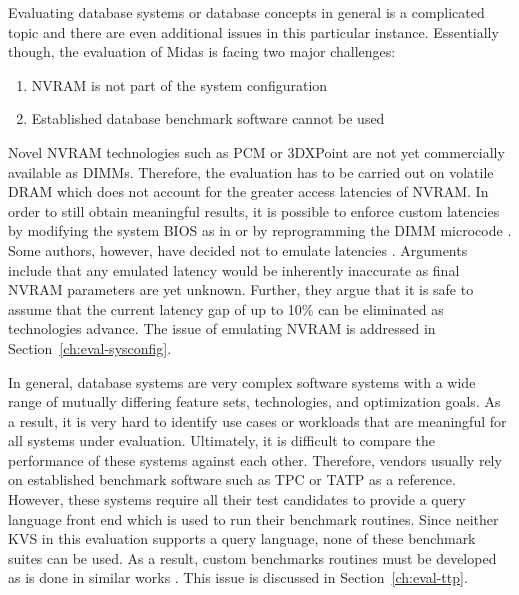 Evaluating database systems or database concepts in general is a complicated
topic and there are even additional issues in this particular instance.
Essentially though, the evaluation of Midas is facing two major challenges:

\begin{enumerate}
    \item NVRAM is not part of the system configuration
    \item Established database benchmark software cannot be used
\end{enumerate}

Novel NVRAM technologies such as PCM or 3DXPoint are not yet commercially
available as DIMMs. Therefore, the evaluation has to be carried out on volatile
DRAM which does not account for the greater access latencies of NVRAM. In order
to still obtain meaningful results, it is possible to enforce custom latencies
by modifying the system BIOS as in \cite{dulloor2014system, oukid2015instant} or
by reprogramming the DIMM microcode \cite{schwalb2016hyrise}. Some authors,
however, have decided not to emulate latencies \cite{bailey2013exploring,
zhou2016nvht}. Arguments include that any emulated latency would be inherently
inaccurate as final NVRAM parameters are yet unknown. Further, they argue that
it is safe to assume that the current latency gap of up to 10\% can be
eliminated as technologies advance. The issue of emulating NVRAM is addressed in
Section~\ref{ch:eval-sysconfig}.

In general, database systems are very complex software systems with a wide range
of mutually differing feature sets, technologies, and optimization goals. As a
result, it is very hard to identify use cases or workloads that are meaningful
for all systems under evaluation. Ultimately, it is difficult to compare the
performance of these systems against each other. Therefore, vendors usually rely
on established benchmark software such as TPC \cite{schwalb2016hyrise} or TATP
\cite{oukid2015instant} as a reference. However, these systems require all their
test candidates to provide a query language front end which is used to run their
benchmark routines. Since neither KVS in this evaluation supports a query
language, none of these benchmark suites can be used. As a result, custom
benchmarks routines must be developed as is done in similar works
\cite{bailey2013exploring, zhou2016nvht}. This issue is discussed in
Section~\ref{ch:eval-ttp}.
